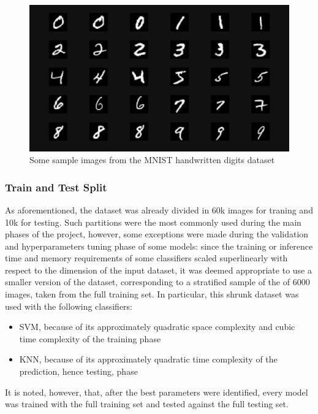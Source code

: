 \begin{figure}[h]
    \centering
    \includegraphics[scale=0.15]{images/mnist-data/digit-samples.png}
    \caption{Some sample images from the MNIST handwritten digits dataset}
    \label{fig:mnist_data_image_samples}
\end{figure}

\subsubsection{Train and Test Split}

As aforementioned, the dataset was already divided in 60k images for traning and 10k for testing. Such partitions were the most commonly used during the main phases of the project, however, some exceptions were made during the validation and hyperparameters tuning phase of some models: since the training or inference time and memory requirements of some classifiers scaled superlinearly with respect to the dimension of the input dataset, it was deemed appropriate to use a smaller version of the dataset, corresponding to a stratified sample of the of 6000 images, taken from the full training set. In particular, this shrunk dataset was used with the following classifiers:

\begin{itemize}
    \item SVM, because of its approximately quadratic space complexity and cubic time complexity of the training phase
    
    \item KNN, because of its approximately quadratic time complexity of the prediction, hence testing, phase
\end{itemize}

It is noted, however, that, after the best parameters were identified, every model was trained with the full training set and tested against the full testing set.

